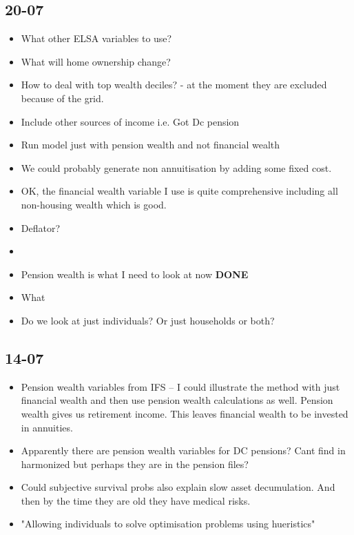 \documentclass[12pt]{article}
\begin{document}
\subsection{\textbf{20-07}}
\begin{itemize}
      \item What other ELSA variables to use?
      \item What will home ownership change?
      \item How to deal with top wealth deciles? - at the moment they are
            excluded because of the grid.
      \item Include other sources of income i.e. Got Dc pension
      \item Run model just with pension wealth and not financial wealth
      \item We could probably generate non annuitisation by adding some fixed
            cost.
      \item OK, the financial wealth variable I use is quite comprehensive
            including all non-housing wealth which is good.
      \item Deflator?
      \item

      \item Pension wealth is what I need to look at now \textbf{DONE}
      \item What
      \item Do we look at just individuals? Or just households or both?
\end{itemize}

\subsection{\textbf{14-07}}
\begin{itemize}
      \item Pension wealth variables from IFS -- I could illustrate the method
            with just financial wealth and then use pension wealth calculations
            as well. Pension wealth gives us retirement income. This leaves
            financial wealth to be invested in annuities.

      \item Apparently there are pension wealth variables for DC pensions? Cant
            find in harmonized but perhaps they are in the pension files?

      \item Could subjective survival probs also explain slow asset
            decumulation. And then by the time they are old they have medical
            risks.

      \item "Allowing individuals to solve optimisation problems using
            hueristics"
\end{itemize}
\end{document}
